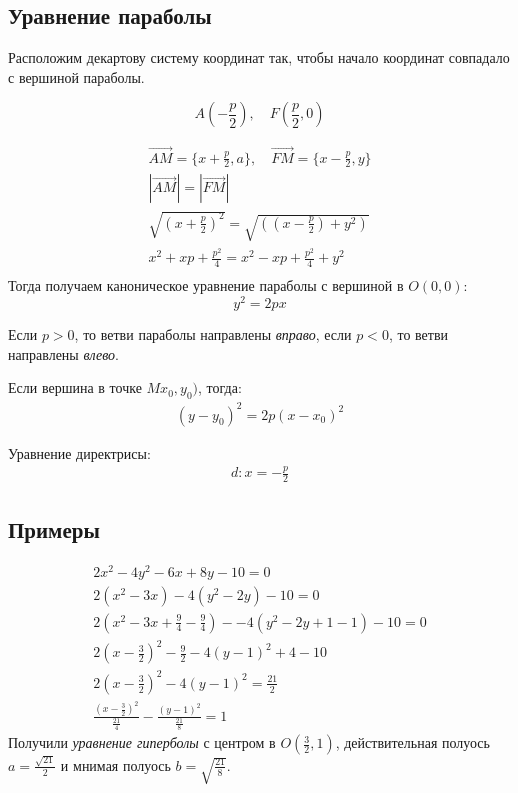 \subsection*{Уравнение параболы}

Расположим декартову систему координат так, чтобы начало координат совпадало с вершиной параболы.

\[
A(-\frac{p}{2}), \quad F(\frac{p}{2}, 0)
\] 

\begin{gather*}
  \overrightarrow{AM} = \{x + \frac{p}{2}, a\}, \quad \overrightarrow{FM} = \{x - \frac{p}{2}, y\} \\
  |\overrightarrow{AM}| = |\overrightarrow{FM}| \\
  \sqrt{\left( x + \frac{p}{2} \right)^2 } = \sqrt{\left( (x - \frac{p}{2}) + y^2 \right)} \\
  x^2 + xp + \frac{p^2}{4} = x^2 - xp + \frac{p^2}{4} + y^2 \\
\end{gather*}
Тогда получаем каноническое уравнение параболы с вершиной в $O(0, 0)$:  \[
  \boxed{y^2 = 2px}
\] 

Если $p > 0$, то ветви параболы направлены \textit{вправо}, если  $p < 0$, то ветви направлены  \textit{влево}.

Если вершина в точке $Mx_0, y_0)$, тогда: 
\begin{gather*}
  (y - y_0)^2 = 2p(x - x_0)^2
\end{gather*}

Уравнение директрисы:
\begin{gather*}
  d: x = -\frac{p}{2}
\end{gather*}

\subsection{Примеры}

\begin{eg}
  \begin{gather*}
    2x^2 - 4y^2 - 6x + 8y - 10 = 0 \\
    2(x^2 - 3x) - 4(y^2 - 2y) - 10 = 0 \\
    2(x^2 - 3x + \frac{9}{4} - \frac{9}{4}) - -4(y^2 - 2y + 1 - 1) - 10 = 0 \\
    2(x - \frac{3}{2})^2 - \frac{9}{2} - 4(y - 1)^2 + 4 - 10 \\
    2\left( x - \frac{3}{2} \right) ^2 - 4(y - 1)^2 = \frac{21}{2} \\
    \frac{\left( x - \frac{3}{2} \right)^2 }{\frac{21}{4}} - \frac{\left( y - 1 \right)^2}{\frac{21}{8}} = 1
  \end{gather*}
  Получили \textit{уравнение гиперболы} с центром в $O\left(\frac{3}{2}, 1\right)$, действительная полуось $a = \frac{\sqrt{21}}{2}$ и мнимая полуось $b = \sqrt{\frac{21}{8}}$.
\end{eg}

